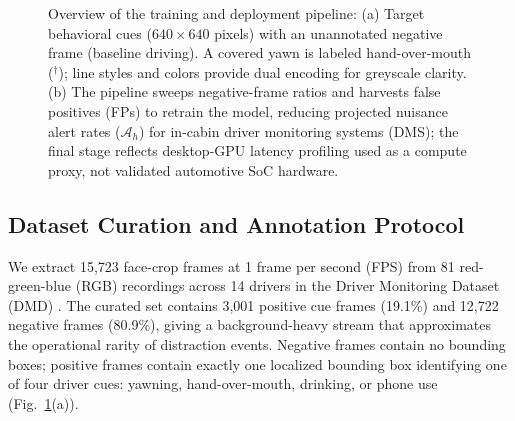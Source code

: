\documentclass[conference]{IEEEtran}
\begin{document}
\begin{figure}[t]
\caption{Overview of the training and deployment pipeline: (a) Target behavioral cues ($640 \times 640$ pixels) with an unannotated negative frame (baseline driving). A covered yawn is labeled hand-over-mouth ($^{\dagger}$); line styles and colors provide dual encoding for greyscale clarity. (b) The pipeline sweeps negative-frame ratios and harvests false positives (FPs) to retrain the model, reducing projected nuisance alert rates ($\mathcal{A}_h$) for in-cabin driver monitoring systems (DMS); the final stage reflects desktop-GPU latency profiling used as a compute proxy, not validated automotive SoC hardware.}
\label{fig:combined_framework}
\end{figure}

\subsection{Dataset Curation and Annotation Protocol}
\label{subsec:data}
We extract 15,723 face-crop frames at 1 frame per second (FPS) from 81 red-green-blue (RGB) recordings across 14 drivers in the Driver Monitoring Dataset (DMD) \cite{ortega2020dmd}. The curated set contains 3,001 positive cue frames (19.1\%) and 12,722 negative frames (80.9\%), giving a background-heavy stream that approximates the operational rarity of distraction events. Negative frames contain no bounding boxes; positive frames contain exactly one localized bounding box identifying one of four driver cues: yawning, hand-over-mouth, drinking, or phone use (Fig.~\ref{fig:combined_framework}(a)).
\end{document}
